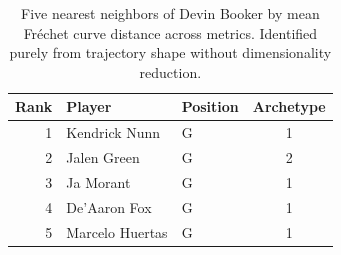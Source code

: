 \begin{table}[htbp]
  \centering\small
  \begin{tabular}{rllc}
    \toprule
    Rank & Player & Position & Archetype \\
    \midrule
    1 & Kendrick Nunn & G & 1 \\
    2 & Jalen Green & G & 2 \\
    3 & Ja Morant & G & 1 \\
    4 & De'Aaron Fox & G & 1 \\
    5 & Marcelo Huertas & G & 1 \\
    \bottomrule
  \end{tabular}
  \caption{Five nearest neighbors of Devin Booker by mean Fr\'{e}chet curve distance across metrics. Identified purely from trajectory shape without dimensionality reduction.}
  \label{tab:Devin_Booker_frechet_curve_neighbors}
\end{table}

